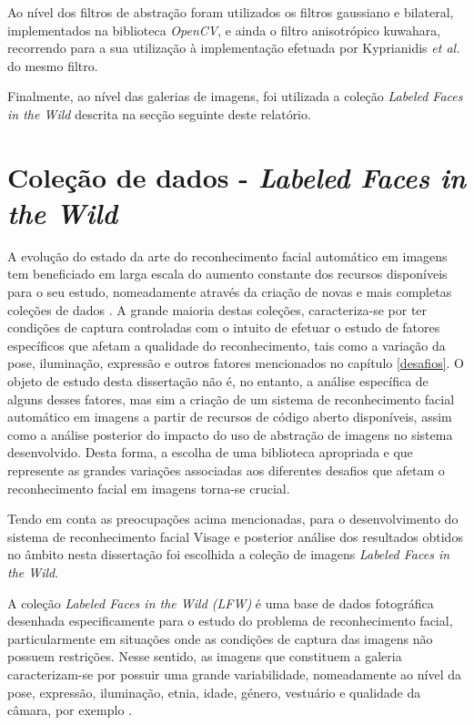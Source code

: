 Ao nível dos filtros de abstração foram utilizados os filtros gaussiano e bilateral, implementados na biblioteca \textit{OpenCV}, e ainda o filtro anisotrópico kuwahara, recorrendo para a sua utilização à implementação efetuada por Kyprianidis \textit{et al.} \cite{Kyprianidis2009} do mesmo filtro.

Finalmente, ao nível das galerias de imagens, foi utilizada a coleção \textit{Labeled Faces in the Wild} descrita na secção seguinte deste relatório.


\section{Coleção de dados - \textit{Labeled Faces in the Wild}} \label{sec:lfw}

A evolução do estado da arte do reconhecimento facial automático em imagens tem beneficiado em larga escala do aumento constante dos recursos disponíveis para o seu estudo, nomeadamente através da criação de novas e mais completas coleções de dados \cite{Huang2007}. A grande maioria destas coleções, caracteriza-se por ter condições de captura controladas com o intuito de efetuar o estudo de fatores específicos que afetam a qualidade do reconhecimento, tais como a variação da pose, iluminação, expressão e outros fatores mencionados no capítulo \ref{desafios}. O objeto de estudo desta dissertação não é, no entanto, a análise específica de alguns desses fatores, mas sim a criação de um sistema de reconhecimento facial automático em imagens a partir de recursos de código aberto disponíveis, assim como a análise posterior do impacto do uso de abstração de imagens no sistema desenvolvido. Desta forma, a escolha de uma biblioteca apropriada e que represente as grandes variações associadas aos diferentes desafios que afetam o reconhecimento facial em imagens torna-se crucial.

Tendo em conta as preocupações acima mencionadas, para o desenvolvimento do sistema de reconhecimento facial  Visage e posterior análise dos resultados obtidos no âmbito nesta dissertação foi escolhida a coleção de imagens \textit{Labeled Faces in the Wild}.

A coleção \textit{Labeled Faces in the Wild (LFW)} é uma base de dados fotográfica desenhada especificamente para o estudo do problema de reconhecimento facial, particularmente em situações onde as condições de captura das imagens não possuem restrições. Nesse sentido, as imagens que constituem a galeria caracterizam-se por possuir uma grande variabilidade, nomeadamente ao nível da pose, expressão, iluminação, etnia, idade, género, vestuário e qualidade da câmara, por exemplo \cite{Huang2007}.

